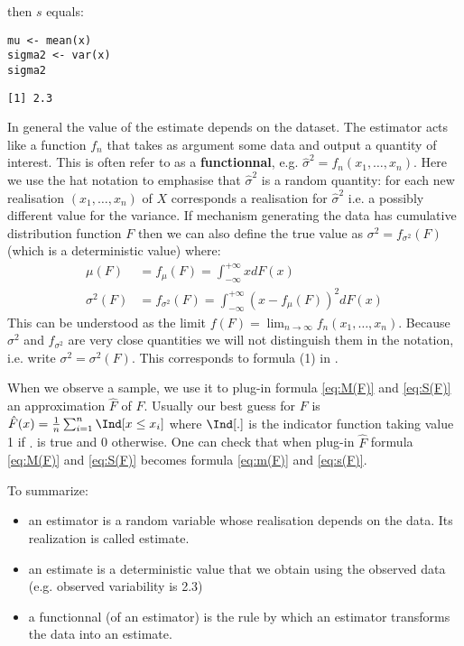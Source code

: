 \documentclass[12pt]{article}
\begin{document}
then \(s\) equals:
\lstset{language=r,label= ,caption= ,captionpos=b,numbers=none}
\begin{lstlisting}
mu <- mean(x)
sigma2 <- var(x)
sigma2
\end{lstlisting}

\begin{verbatim}
[1] 2.3
\end{verbatim}

In general the value of the estimate depends on the dataset. The
estimator acts like a function \(f_n\) that takes as argument some
data and output a quantity of interest. This is often refer to as a
\textbf{functionnal}, e.g. \(\hat{\sigma}^2=f_n(x_1,\ldots,x_n)\). Here we
use the hat notation to emphasise that \(\hat{\sigma}^2\) is a random
quantity: for each new realisation \((x_1,\ldots,x_n)\) of \(X\)
corresponds a realisation for \(\hat{\sigma}^2\) i.e. a possibly
different value for the variance. If mechanism generating the data has
cumulative distribution function \(F\) then we can also define the
true value as \(\sigma^2=f_{\sigma^2}(F)\) (which is a deterministic
value) where:
\begin{align}
\mu(F) &= f_\mu(F) = \int_{-\infty}^{+\infty} x dF(x) \label{eq:M(F)}\\
\sigma^2(F) &= f_{\sigma^2}(F) = \int_{-\infty}^{+\infty} (x - f_\mu(F))^2 dF(x) \label{eq:S(F)}
\end{align}
This can be understood as the limit \(f(F)=\lim_{n \rightarrow \infty}
f_n(x_1,\ldots,x_n)\). Because \(\sigma^2\) and \(f_{\sigma^2}\) are
very close quantities we will not distinguish them in the notation,
i.e. write \(\sigma^2=\sigma^2(F)\). This corresponds to formula (1)
in \cite{lee1990u}. 

\bigskip

When we observe a sample, we use it to plug-in formula \eqref{eq:M(F)}
and \eqref{eq:S(F)} an approximation \(\hat{F}\) of \(F\). Usually our
best guess for \(F\) is \(\hat{F}(x)= \frac{1}{n}\sum_{i=1}^n
\Ind[x \leq x_i]\) where \(\Ind[.]\) is the indicator function taking value
1 if \(.\) is true and 0 otherwise. One can check that when plug-in
\(\hat{F}\) formula \eqref{eq:M(F)} and \eqref{eq:S(F)} becomes formula
\eqref{eq:m(F)} and \eqref{eq:s(F)}.

\bigskip

To summarize:
\begin{itemize}
\item an estimator is a random variable whose realisation depends on the
data. Its realization is called estimate.
\item an estimate is a deterministic value that we obtain using the
observed data (e.g. observed variability is 2.3)
\item a functionnal (of an estimator) is the rule by which an estimator
transforms the data into an estimate.
\end{itemize}
\end{document}
